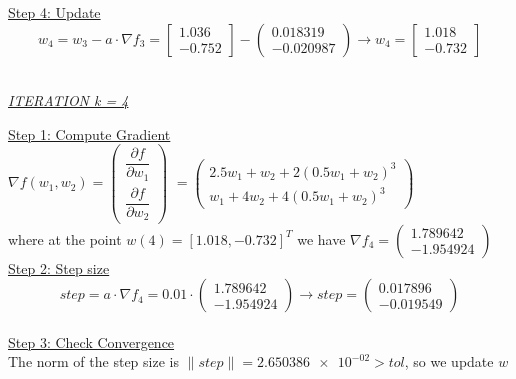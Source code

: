 \underline{Step 4: Update}
\[ 
w_4 = w_3 - a\cdot \nabla f_3 =  \left[\begin{array}{c}
	1.036\\
	-0.752
\end{array}\right] - \left(\begin{array}{c}
	0.018319 \\
	-0.020987
\end{array}\right) \rightarrow
w_4 = \left[\begin{array}{c}
	1.018\\
	-0.732
\end{array}\right]
\]
\\[4mm]

\begin{center}
	\underline{\textit{ITERATION k = 4}}
\end{center}

\underline{Step 1: Compute Gradient}\\
\(\nabla f(w_1,w_2) = \left(\begin{array}{c}
	\dfrac{\partial f}{\partial w_1} \\[4mm]
	\dfrac{\partial f}{\partial w_2}
\end{array}\right)\) $= \left(\begin{array}{c}
	2.5w_1 + w_2 + 2(0.5w_1+w_2)^3\\[1mm]
	w_1 + 4w_2 + 4(0.5w_1+w_2)^3
\end{array}\right)$ \\[3mm]

where at the point $w\left(4\right) = \left[1.018, -0.732\right]^T$ we have $\nabla f_{4} = \left(\begin{array}{c}
	1.789642 \\
	-1.954924
\end{array}\right)$
\\[4mm]

\underline{Step 2: Step size}
\[
step = a \cdot \nabla f_{4} = 0.01 \cdot \left(\begin{array}{c}
	1.789642 \\
-1.954924
\end{array}\right) \rightarrow step =\left(\begin{array}{c}
	0.017896 \\
	-0.019549
\end{array}\right)
\]
\\[4mm]

\underline{Step 3: Check Convergence}\\
The norm of the step size is $\| step \| = \num{2.650386e-02} > tol$, so we update $w$
\\[4mm]


